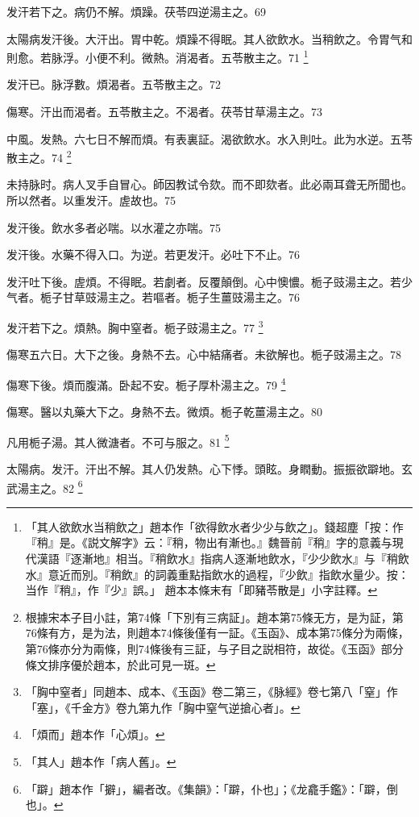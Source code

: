发汗若下之。{\khaai 病仍}不解。煩躁。茯苓四逆湯主之。69

太陽病发汗後。大汗出。胃中乾。煩躁不得眠。其人欲飲水。当稍飲之。令胃气和則愈。若脉浮。小便不利。微熱。消渴者。五苓散主之。71
	\footnote{
		「其人欲飲水当稍飲之」趙本作「欲得飲水者少少与飲之」。錢超塵「按：作『稍』是。《説文解字》云：『稍，物出有漸也。』魏晉前『稍』字的意義与現代漢語『逐漸地』相当。『稍飲水』指病人逐漸地飲水，『少少飲水』与『稍飲水』意近而別。『稍飲』的詞義重點指飲水的過程，『少飲』指飲水量少。按：当作『稍』，作『少』誤。」
		趙本本條末有「即豬苓散是」小字註釋。
	}

发汗已。脉浮數。煩渴者。五苓散主之。72

傷寒。汗出而渴者。五苓散主之。不渴者。茯苓甘草湯主之。73

中風。发熱。六七日不解而煩。有表裏証。渴欲飲水。水入則吐。此为水逆。五苓散主之。74
	\footnote{
		根據宋本子目小註，第74條「下別有三病証」。趙本第75條无方，是为証，第76條有方，是为法，則趙本74條後僅有一証。《玉函》、成本第75條分为兩條，第76條亦分为兩條，則74條後有三証，与子目之説相符，故從。《玉函》部分條文排序優於趙本，於此可見一斑。
	}

未持脉时。病人叉手自冒心。師因教试令欬。而不即欬者。此必兩耳聋无所聞也。所以然者。以重发汗。虗故也。75

发汗後。飲水多者必喘。以水灌之亦喘。75

发汗後。水藥不得入口。为逆。{\khaai 若更发汗。必吐下不止。}76

发汗吐下後。虗煩。不得眠。若劇者。反覆顛倒。心中懊憹。栀子{\khaai 豉}湯主之。若少气者。栀子甘草{\khaai 豉}湯主之。若嘔者。栀子生薑{\khaai 豉}湯主之。76

发汗若下之。煩熱。胸中窒者。栀子{\khaai 豉}湯主之。77
	\footnote{
		「胸中窒者」同趙本、成本、《玉函》卷二第三，《脉經》卷七第八「窒」作「塞」，《千金方》卷九第九作「胸中窒气逆搶心者」。
	}

傷寒五六日。大下之後。身熱不去。心中結痛者。未欲解也。栀子{\khaai 豉}湯主之。78

傷寒下後。煩而腹滿。卧起不安。栀子厚朴湯主之。79
	\footnote{
		「煩而」趙本作「心煩」。
	}

傷寒。醫以丸藥大下之。身熱不去。微煩。栀子乾薑湯主之。80

凡用栀子湯。其人微溏者。不可与服之。81
	\footnote{
		「其人」趙本作「病人舊」。
	}

太陽病。发汗。汗出不解。其人仍发熱。心下悸。頭眩。身瞤動。振振欲躃地。玄武湯主之。82
	\footnote{
		「躃」趙本作「擗」，編者改。《集韻》：「躃，仆也」；《龙龕手鑑》：「躃，倒也」。
	}

